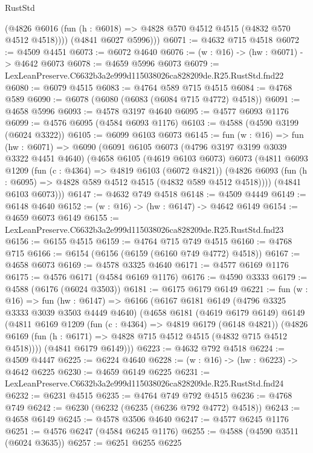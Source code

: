 \begin{lexlean}{RustStd}
\begin{coremodule}
          (@4826 @6016 (fun (h : @6018) => @4828 @570 @4512 @4515 (@4832 @570 @4512 @4518))))
        (@4841 @6027 @5996)))
@6071 := @4632 @715 @4518
@6072 := @4509 @4451
@6073 := @6072 @4640
@6076 := (w : @16) -> (hw : @6071) -> @4642 @6073
@6078 := @4659 @5996 @6073
@6079 := LexLeanPreserve.C6632b3a2e999d115038026ca828209de.R25.RustStd.fnd22
@6080 := @6079 @4515
@6083 := @4764 @589 @715 @4515
@6084 := @4768 @589
@6090 := @6078 (@6080 (@6083 (@6084 @715 @4772) @4518))
@6091 := @4658 @5996
@6093 := @4578 @3197 @4640
@6095 := @4577 @6093 @1176
@6099 := @4576 @6095 (@4584 @6093 @1176)
@6103 := @4588 (@4590 @3199 (@6024 @3322))
@6105 := @6099 @6103 @6073
@6145 := fun (w : @16) =>
  fun (hw : @6071) =>
  @6090
    (@6091
      @6105
      @6073
      (@4796 @3197 @3199 @3039 @3322 @4451 @4640)
      (@4658
        @6105
        (@4619 @6103 @6073)
        @6073
        (@4811
          @6093
          @1209
          (fun (c : @4364) => @4819 @6103 (@6072 @4821))
          (@4826 @6093 (fun (h : @6095) => @4828 @589 @4512 @4515 (@4832 @589 @4512 @4518))))
        (@4841 @6103 @6073)))
@6147 := @4632 @749 @4518
@6148 := @4509 @4449
@6149 := @6148 @4640
@6152 := (w : @16) -> (hw : @6147) -> @4642 @6149
@6154 := @4659 @6073 @6149
@6155 := LexLeanPreserve.C6632b3a2e999d115038026ca828209de.R25.RustStd.fnd23
@6156 := @6155 @4515
@6159 := @4764 @715 @749 @4515
@6160 := @4768 @715
@6166 := @6154 (@6156 (@6159 (@6160 @749 @4772) @4518))
@6167 := @4658 @6073
@6169 := @4578 @3325 @4640
@6171 := @4577 @6169 @1176
@6175 := @4576 @6171 (@4584 @6169 @1176)
@6176 := @4590 @3333
@6179 := @4588 (@6176 (@6024 @3503))
@6181 := @6175 @6179 @6149
@6221 := fun (w : @16) =>
  fun (hw : @6147) =>
  @6166
    (@6167
      @6181
      @6149
      (@4796 @3325 @3333 @3039 @3503 @4449 @4640)
      (@4658
        @6181
        (@4619 @6179 @6149)
        @6149
        (@4811
          @6169
          @1209
          (fun (c : @4364) => @4819 @6179 (@6148 @4821))
          (@4826 @6169 (fun (h : @6171) => @4828 @715 @4512 @4515 (@4832 @715 @4512 @4518))))
        (@4841 @6179 @6149)))
@6223 := @4632 @792 @4518
@6224 := @4509 @4447
@6225 := @6224 @4640
@6228 := (w : @16) -> (hw : @6223) -> @4642 @6225
@6230 := @4659 @6149 @6225
@6231 := LexLeanPreserve.C6632b3a2e999d115038026ca828209de.R25.RustStd.fnd24
@6232 := @6231 @4515
@6235 := @4764 @749 @792 @4515
@6236 := @4768 @749
@6242 := @6230 (@6232 (@6235 (@6236 @792 @4772) @4518))
@6243 := @4658 @6149
@6245 := @4578 @3506 @4640
@6247 := @4577 @6245 @1176
@6251 := @4576 @6247 (@4584 @6245 @1176)
@6255 := @4588 (@4590 @3511 (@6024 @3635))
@6257 := @6251 @6255 @6225

\end{coremodule}
\end{lexlean}
